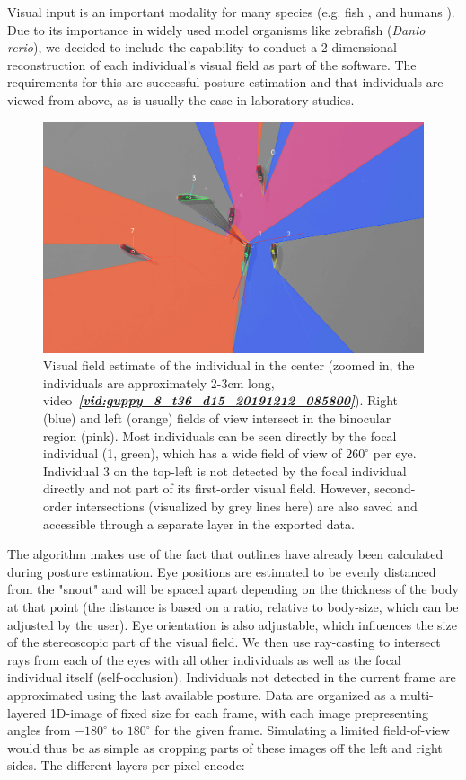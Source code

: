 \documentclass[9pt,lineno]{elife}
\newcommand{\videoref}[1]{video~\textit{\textbf{\ref{#1}}}}
\begin{document}
Visual input is an important modality for many species (e.g. fish \citealt{strandburg2013visual}, \citealt{bilotta2001zebrafish} and humans \citealt{colavita1974human}). Due to its importance in widely used model organisms like zebrafish (\emph{Danio rerio}), we decided to include the capability to conduct a 2-dimensional reconstruction of each individual's visual field as part of the software. The requirements for this are successful posture estimation and that individuals are viewed from above, as is usually the case in laboratory studies.

\begin{figure}
    \centering
    \includegraphics[width=\textwidth]{screenshot_visual_field.jpg}

    \caption{Visual field estimate of the individual in the center (zoomed in, the individuals are approximately 2-3cm long, \videoref{vid:guppy_8_t36_d15_20191212_085800}). Right (blue) and left (orange) fields of view intersect in the binocular region (pink). Most individuals can be seen directly by the focal individual (1, green), which has a wide field of view of $260^\circ$ per eye. Individual 3 on the top-left is not detected by the focal individual directly and not part of its first-order visual field. However, second-order intersections (visualized by grey lines here) are also saved and accessible through a separate layer in the exported data.}
	\label{fig:occlusion}
\end{figure}

The algorithm makes use of the fact that outlines have already been calculated during posture estimation. Eye positions are estimated to be evenly distanced from the "snout" and will be spaced apart depending on the thickness of the body at that point (the distance is based on a ratio, relative to body-size, which can be adjusted by the user). Eye orientation is also adjustable, which influences the size of the stereoscopic part of the visual field. We then use ray-casting to intersect rays from each of the eyes with all other individuals as well as the focal individual itself (self-occlusion). Individuals not detected in the current frame are approximated using the last available posture. Data are organized as a multi-layered 1D-image of fixed size for each frame, with each image prepresenting angles from $-180^{\circ}$ to $180^{\circ}$ for the given frame. Simulating a limited field-of-view would thus be as simple as cropping parts of these images off the left and right sides. The different layers per pixel encode:
\end{document}
